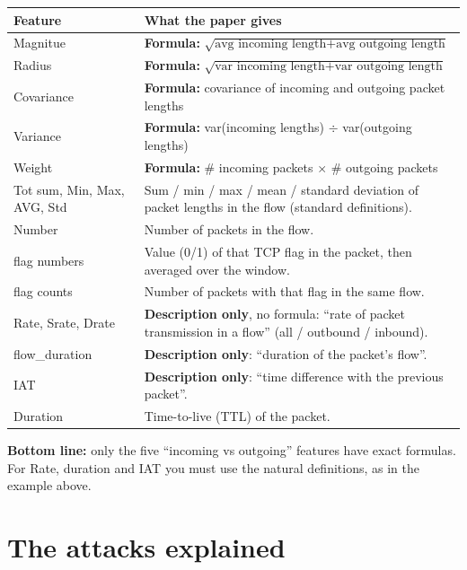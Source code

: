 \documentclass[11pt]{article}
\begin{document}
\begin{longtable}{@{}>{\ttfamily\raggedright}p{3.6cm} >{\raggedright\arraybackslash}p{12.2cm}@{}}
\toprule
\textrm{\textbf{Feature}} & \textbf{What the paper gives} \\
\midrule
\endhead
Magnitue & \textbf{Formula:} $\sqrt{\mbox{avg incoming length} + \mbox{avg outgoing length}}$ \\
Radius & \textbf{Formula:} $\sqrt{\mbox{var incoming length} + \mbox{var outgoing length}}$ \\
Covariance & \textbf{Formula:} covariance of incoming and outgoing packet lengths \\
Variance & \textbf{Formula:} var(incoming lengths) $\div$ var(outgoing lengths) \\
Weight & \textbf{Formula:} \# incoming packets $\times$ \# outgoing packets \\
Tot sum, Min, Max, AVG, Std & Sum / min / max / mean / standard deviation of packet lengths in the flow (standard definitions). \\
Number & Number of packets in the flow. \\
flag numbers & Value (0/1) of that TCP flag in the packet, then averaged over the window. \\
flag counts & Number of packets with that flag in the same flow. \\
Rate, Srate, Drate & \textbf{Description only}, no formula: ``rate of packet transmission in a flow'' (all / outbound / inbound). \\
flow\_duration & \textbf{Description only}: ``duration of the packet's flow''. \\
IAT & \textbf{Description only}: ``time difference with the previous packet''. \\
Duration & Time-to-live (TTL) of the packet. \\
\bottomrule
\end{longtable}

\textbf{Bottom line:} only the five ``incoming vs outgoing'' features have exact formulas. For Rate, duration and IAT you must use the natural definitions, as in the example above.

\newpage
\section*{The attacks explained}
\end{document}
